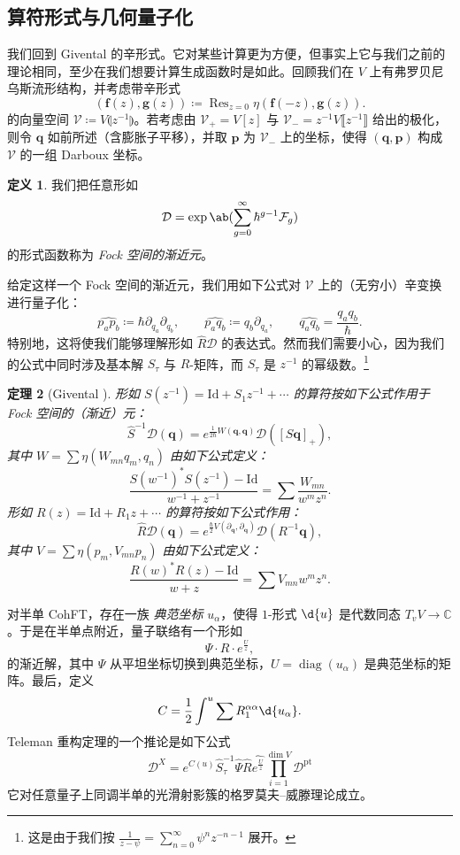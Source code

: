 \documentclass{amsart}
\newtheorem{thm}{定理}[section]
\theoremstyle{definition}
\newtheorem{defn}[thm]{定义}
\theoremstyle{remark}
\theoremstyle{plain}
\theoremstyle{definition}
\theoremstyle{remark}
\newcommand{\C}{\mathbb{C}}
\newcommand{\mc}[1]{\mathcal{#1}}
\newcommand{\mbf}[1]{\mathbf{#1}}
\newcommand{\bq}{\mbf{q}}
\newcommand{\bp}{\mbf{p}}
\newcommand{\mr}[1]{\mathrm{#1}}
\newcommand{\on}[1]{\operatorname{#1}}
\newcommand{\wh}[1]{\widehat{#1}}
\newcommand{\1}{\mathbf{1}}
\newcommand{\2}{\mathbf{2}}
\newcommand{\3}{\mathbf{3}}
\newcommand{\ps}[1]{\llbracket #1 \rrbracket}
\newcommand{\ls}[1]{\llparenthesis #1 \rrparenthesis}
\begin{document}
\subsection{算符形式与几何量子化}%
\label{sub:Operator formalism and geometric quantization}

我们回到 Givental 的辛形式。它对某些计算更为方便，但事实上它与我们之前的理论相同，至少在我们想要计算生成函数时是如此。回顾我们在 $V$ 上有弗罗贝尼乌斯流形结构，并考虑带辛形式
\[ (\mbf{f}(z), \mbf{g}(z)) \coloneqq \on{Res}_{z=0} \eta(\mbf{f}(-z), \mbf{g}(z)). \]
的向量空间 $\mc{V}\coloneqq V\ls{z^{-1}}$。若考虑由 $\mc{V}_+ = V[z]$ 与 $\mc{V}_- = z^{-1}V\ps{z^{-1}}$ 给出的极化，则令 $\bq$ 如前所述（含膨胀子平移），并取 $\bp$ 为 $\mc{V}_-$ 上的坐标，使得 $(\bq, \bp)$ 构成 $\mc{V}$ 的一组 Darboux 坐标。

\begin{defn}
    我们把任意形如
    \[ \mc{D} = \exp\ab(\sum_{g=0}^{\infty} \hbar^{g-1} \mc{F}_g) \]
    的形式函数称为 \textit{Fock 空间的渐近元}。
\end{defn}

给定这样一个 Fock 空间的渐近元，我们用如下公式对 $\mc{V}$ 上的（无穷小）辛变换进行量子化：
\[ \wh{p_a p_b} \coloneqq \hbar \partial_{q_a} \partial_{q_b}, \qquad \wh{p_a q_b} \coloneqq q_b \partial_{q_a}, \qquad \wh{q_a q_b} = \frac{q_a q_b}{\hbar}. \]
特别地，这将使我们能够理解形如 $\hat{R} \mc{D}$ 的表达式。然而我们需要小心，因为我们的公式中同时涉及基本解 $S_{\tau}$ 与 $R$-矩阵，而 $S_{\tau}$ 是 $z^{-1}$ 的幂级数。\footnote{这是由于我们按 $\frac{1}{z-\psi} = \sum_{n=0}^{\infty} \psi^n z^{-n-1}$ 展开。}

\begin{thm}[Givental {\cite{Givental2001quantization}}]
    形如 $S(z^{-1}) = \mr{Id} + S_1 z^{-1} + \cdots$ 的算符按如下公式作用于 Fock 空间的（渐近）元：
    \[ \hat{S}^{-1} \mc{D}(\bq) = e^{\frac{1}{2\hbar}W(\bq,\bq)} \mc{D}([S \bq]_+), \]
    其中 $W = \sum \eta(W_{mn}q_m, q_n)$ 由如下公式定义：
    \[ \frac{S(w^{-1})^* S(z^{-1}) - \mr{Id}}{w^{-1}+z^{-1}} = \sum \frac{W_{mn}}{w^m z^n}. \]
    形如 $R(z) = \mr{Id} + R_1 z + \cdots$ 的算符按如下公式作用：
    \[ \hat{R}\mc{D}(\bq) = e^{\frac{\hbar}{2} V(\partial_{\bq}, \partial_{\bq})} \mc{D}(R^{-1} \bq), \]
    其中 $V = \sum \eta(p_m, V_{mn} p_n)$ 由如下公式定义：
    \[ \frac{R(w)^* R(z) - \mr{Id}}{w+z} = \sum V_{mn} w^m z^n. \]
\end{thm}

对半单 CohFT，存在一族 \textit{典范坐标} $u_{\alpha}$，使得 $1$-形式 $\d{u}$ 是代数同态 $T_v V \to \C$。于是在半单点附近，量子联络有一个形如
\[ \Psi \cdot  R \cdot e^{\frac{U}{z}}, \]
的渐近解，其中 $\Psi$ 从平坦坐标切换到典范坐标，$U = \on{diag}(u_{\alpha})$ 是典范坐标的矩阵。最后，定义
\[ C = \frac{1}{2} \int^u \sum R_1^{\alpha\alpha} \d{u_{\alpha}}. \]
Teleman 重构定理的一个推论是如下公式
\[ \mc{D}^X = e^{C(u)} \hat{S}^{-1}_{\tau} \hat{\Psi} \hat{R} \wh{e^{\frac{U}{z}}} \prod_{i=1}^{\dim V} \mc{D}^{\mr{pt}} \]
它对任意量子上同调半单的光滑射影簇的格罗莫夫–威滕理论成立。
\end{document}
